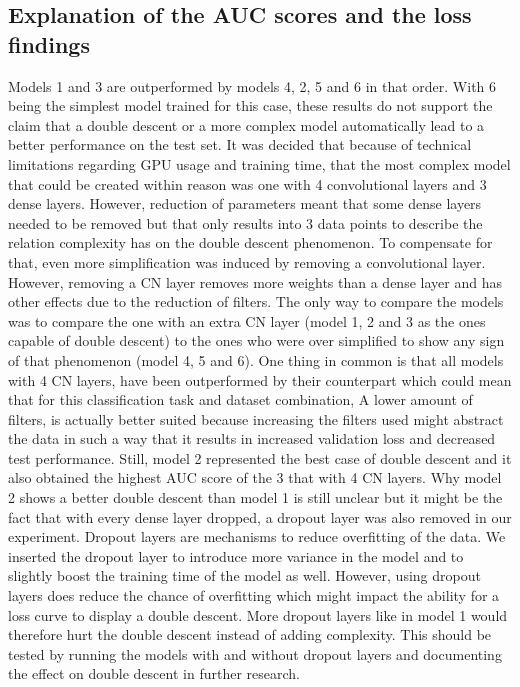 \subsection{Explanation of the AUC scores and the loss findings}
Models 1 and 3 are outperformed by models 4, 2, 5 and 6 in that order. With 6 being the simplest model trained for this case, these results do not support the claim that a double descent or a more complex model automatically lead to a better performance on the test set. It was decided that because of technical limitations regarding GPU usage and training time, that the most complex model that could be created within reason was one with 4 convolutional layers and 3 dense layers. However, reduction of parameters meant that some dense layers needed to be removed but that only results into 3 data points to describe the relation complexity has on the double descent phenomenon. To compensate for that, even more simplification was induced by removing a convolutional layer. However, removing a CN layer removes more weights than a dense layer and has other effects due to the reduction of filters. The only way to compare the models was to compare the one with an extra CN layer (model 1, 2 and 3 as the ones capable of double descent) to the ones who were over simplified to show any sign of that phenomenon (model 4, 5 and 6). One thing in common is that all models with 4 CN layers, have been outperformed by their counterpart which could mean that for this classification task and dataset combination, A lower amount of filters, is actually better suited because increasing the filters used might abstract the data in such a way that it results in increased validation loss and decreased test performance. Still, model 2 represented the best case of double descent and it also obtained the highest AUC score of the 3 that with 4 CN layers. Why model 2 shows a better double descent than model 1 is still unclear but it might be the fact that with every dense layer dropped, a dropout layer was also removed in our experiment. Dropout layers are mechanisms to reduce overfitting of the data. We inserted the dropout layer to introduce more variance in the model and to slightly boost the training time of the model as well. However, using dropout layers does reduce the chance of overfitting which might impact the ability for a loss curve to display a double descent. More dropout layers like in model 1 would therefore hurt the double descent instead of adding complexity. This should be tested by running the models with and without dropout layers and documenting the effect on double descent in further research.

